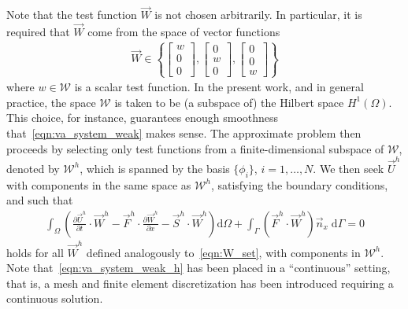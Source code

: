 %
Note that the test function $\vec{W}$ is not chosen arbitrarily.
In particular, it is required that $\vec{W}$ come from the space of
vector functions
\begin{align}
  \label{eqn:W_set}
  \vec{W} \in \left\{
      \begin{bmatrix}
        w \\ 0 \\ 0
      \end{bmatrix},
      \begin{bmatrix}
        0 \\ w \\ 0
      \end{bmatrix},
      \begin{bmatrix}
        0 \\ 0 \\ w
      \end{bmatrix}
    \right\}
\end{align}
where $w \in \mathcal{W}$ is a scalar test function.  In the present
work, and in general practice, the space $\mathcal{W}$ is taken to be
(a subspace of) the Hilbert space $H^1(\Omega)$. This choice, for
instance, guarantees enough smoothness that~\eqref{eqn:va_system_weak}
makes sense.
%
The approximate problem then proceeds by selecting only test functions
from a finite-dimensional subspace of $\mathcal{W}$, denoted by
$\mathcal{W}^h$, which is spanned by the basis $\{\phi_i\}$,
$i=1,\ldots,N$.  We then seek $\vec{U}^h$ with components in the same
space as $\mathcal{W}^h$, satisfying the boundary conditions, and such
that
\begin{align}
  \label{eqn:va_system_weak_h}
  \int_{\Omega} \left(\frac{\partial \vec{U}^h}{\partial t} \cdot \vec{W}^h
    - \vec{F}^h\cdot \frac{\partial \vec{W}^h}{\partial x} - \vec{S}^h\cdot\vec{W}^h \right) \text{d}\Omega
  + \int_{\Gamma} \left( \vec{F}^h \cdot \vec{W}^h \right) \vec{n}_x \;\text{d}\Gamma = 0
\end{align}
holds for all $\vec{W}^h$ defined analogously to~\eqref{eqn:W_set},
with components in $\mathcal{W}^h$. Note that~\eqref{eqn:va_system_weak_h} 
has been placed in a ``continuous'' setting, that is, a mesh and finite element
discretization has been introduced requiring a continuous solution.  
